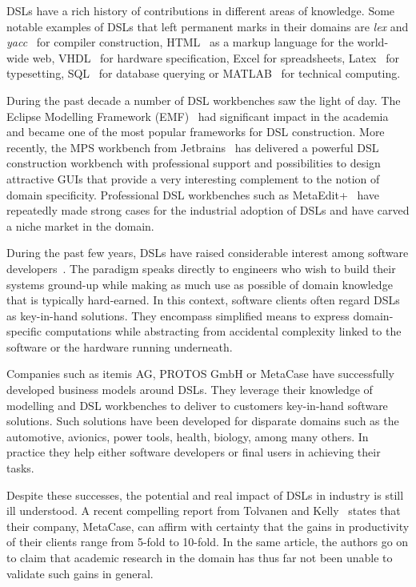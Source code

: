 \documentclass{scrartcl}
\begin{document}
DSLs have a rich history of contributions in different areas of knowledge.
Some notable examples of DSLs that left permanent marks in their domains are
\emph{lex} and \emph{yacc}~\cite{Johnson80} for compiler construction,
HTML~\cite{BernersLee96} as a markup language for the world-wide web,
VHDL~\cite{Ashenden02} for hardware specification, Excel for spreadsheets, Latex~\cite{Lamport1989} for
typesetting, SQL~\cite{Codd70} for database querying or MATLAB~\cite{Gilat07}
for technical computing.

During the past decade a number of DSL workbenches saw the light of day. The
Eclipse Modelling Framework (EMF)~\cite{emf} had significant impact in the
academia and became one of the most popular frameworks for DSL construction.
More recently, the MPS workbench from Jetbrains~\cite{mps} has delivered a
powerful DSL construction workbench with professional support and possibilities
to design attractive GUIs that provide a very interesting complement to the
notion of domain specificity. Professional DSL workbenches such as
MetaEdit+~\cite{metaedit} have repeatedly made strong cases for the industrial
adoption of DSLs and have carved a niche market in the domain.

During the past few years, DSLs have raised considerable interest among software
developers~\cite{Fowler10}. The paradigm speaks directly to engineers who wish
to build their systems ground-up while making as much use as possible of domain
knowledge that is typically hard-earned. In this context, software clients often
regard DSLs as key-in-hand solutions. They encompass simplified means to express
domain-specific computations while abstracting from accidental complexity linked
to the software or the hardware running underneath.

Companies such as itemis AG, PROTOS GmbH or MetaCase have successfully developed
business models around DSLs. They leverage their knowledge of modelling and DSL
workbenches to deliver to customers key-in-hand software solutions. Such
solutions have been developed for disparate domains such as the automotive,
avionics, power tools, health, biology, among many others. In practice they help
either software developers or final users in achieving their tasks.

Despite these successes, the potential and real impact of DSLs in industry is
still ill understood. A recent compelling report from Tolvanen and
Kelly~\cite{Tolvanen016} states that their company, MetaCase, can affirm with
certainty that the gains in productivity of their clients range from 5-fold to
10-fold. In the same article, the authors go on to claim that academic research
in the domain has thus far not been unable to validate such gains in general.
\end{document}
